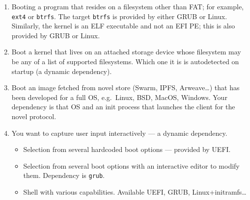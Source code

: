 \begin{enumerate}
  \item Booting a program that resides on a filesystem other than FAT; for example, \texttt{ext4} or \texttt{btrfs}. 
  The target \texttt{btrfs} is provided by either GRUB or Linux.
  Similarly, the kernel is an ELF executable and not an EFI PE; this is also provided by GRUB or Linux. 
  
  \item Boot a kernel that lives on an attached storage device whose filesystem may be any of a list of supported filesystems. 
  Which one it is is autodetected on startup (a dynamic dependency). 
  
  \item Boot an image fetched from novel store (Swarm, IPFS, Arweave\ldots) that has been developed for a full OS, e.g.~Linux, BSD, MacOS, Windows. 
  Your dependency is that OS and an init process that launches the client for the novel protocol.
  
  \item 
    You want to capture user input interactively --- a dynamic dependency.
    \begin{itemize}
      \item Selection from several hardcoded boot options --- provided by UEFI.
      \item Selection from several boot options with an interactive editor to modify them. Dependency is \texttt{grub}.
      \item Shell with various capabilities. Available UEFI, GRUB, Linux+initramfs\ldots{} 
    \end{itemize}
    


\end{enumerate}

